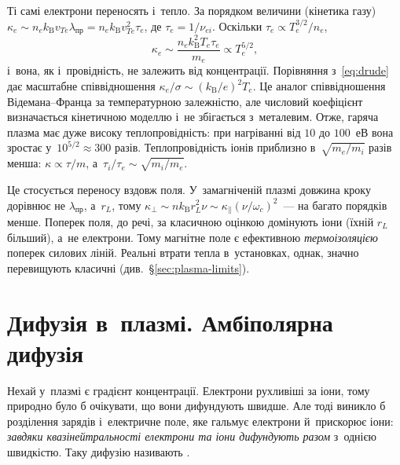 Ті самі електрони переносять і~тепло. За порядком величини (кінетика газу) $\kappa_e\sim
n_ek_{\mathrm B}v_{Te}\lambda_{\mathrm{пр}}=n_ek_{\mathrm B}v_{Te}^2\tau_e$, де
$\tau_e=1/\nu_{ei}$. Оскільки $\tau_e\propto T_e^{3/2}/n_e$,
\begin{equation*}
	\kappa_e\sim\frac{n_ek_{\mathrm B}^2T_e\tau_e}{m_e}\propto T_e^{5/2},
\end{equation*}
і~вона, як і~провідність, не залежить від концентрації. Порівняння з~\eqref{eq:drude} дає
масштабне співвідношення $\kappa_e/\sigma\sim(k_{\mathrm B}/e)^2T_e$. Це аналог
співвідношення Відемана--Франца за температурною залежністю, але числовий коефіцієнт
визначається кінетичною моделлю і~не збігається з~металевим. Отже, гаряча плазма має дуже
високу теплопровідність: при нагріванні від $10$ до $100$~еВ вона зростає
у~$10^{5/2}\approx300$ разів. Теплопровідність іонів приблизно в~$\sqrt{m_e/m_i}$ разів
менша: $\kappa\propto\tau/m$, а~$\tau_i/\tau_e\sim\sqrt{m_i/m_e}$.

Це стосується переносу вздовж поля. У~замагніченій плазмі довжина кроку дорівнює не
$\lambda_{\mathrm{пр}}$, а~$r_L$, тому $\kappa_\perp\sim n k_{\mathrm
B}r_L^2\nu\sim\kappa_\parallel(\nu/\omega_c)^2$~--- на багато порядків менше. Поперек
поля, до речі, за класичною оцінкою домінують іони (їхній $r_L$ більший), а~не електрони.
Тому магнітне поле є ефективною \emph{термоізоляцією} поперек силових ліній. Реальні
втрати тепла в~установках, однак, значно перевищують класичні
(див.~§\ref{sec:plasma-limits}).



\section{Дифузія в~плазмі. Амбіполярна дифузія}\label{sec:ambipolar}



Нехай у~плазмі є градієнт концентрації. Електрони рухливіші за іони, тому природно було б
очікувати, що вони дифундують швидше. Але тоді виникло б розділення зарядів і~електричне
поле, яке гальмує електрони й~прискорює іони: \emph{завдяки квазінейтральності електрони
та іони дифундують разом} з~однією швидкістю. Таку дифузію називають .

